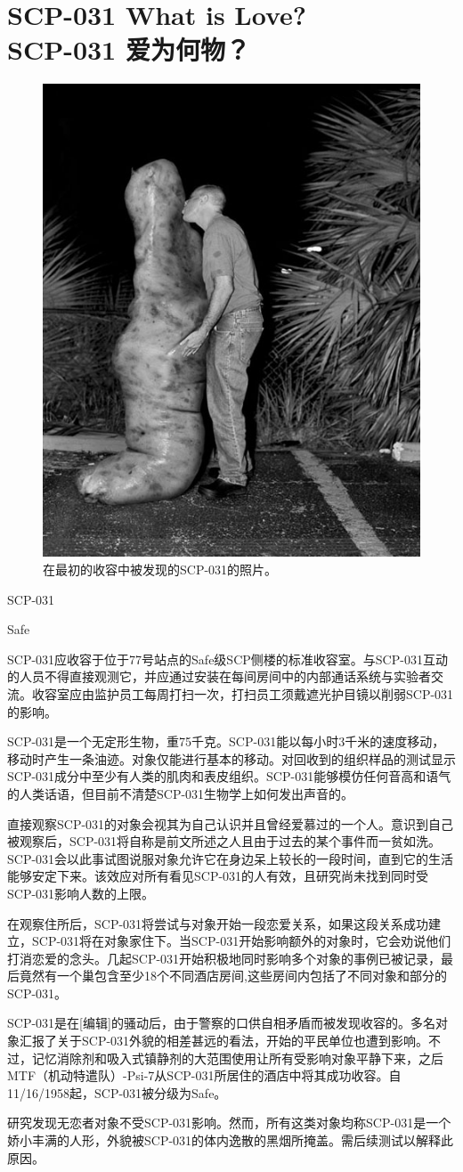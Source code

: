 \chapter[SCP-031 爱为何物？]{
    SCP-031 What is Love?\\
    SCP-031 爱为何物？
}

\label{chap:SCP-031}

\begin{figure}[H]
    \centering
    \includegraphics[width=0.5\linewidth]{images/SCP.031.jpg}
    \caption*{在最初的收容中被发现的SCP-031的照片。}
\end{figure}

SCP-031

Safe

SCP-031应收容于位于77号站点的Safe级SCP侧楼的标准收容室。与SCP-031互动的人员不得直接观测它，并应通过安装在每间房间中的内部通话系统与实验者交流。收容室应由监护员工每周打扫一次，打扫员工须戴遮光护目镜以削弱SCP-031的影响。

SCP-031是一个无定形生物，重75千克。SCP-031能以每小时3千米的速度移动，移动时产生一条油迹。对象仅能进行基本的移动。对回收到的组织样品的测试显示SCP-031成分中至少有人类的肌肉和表皮组织。SCP-031能够模仿任何音高和语气的人类话语，但目前不清楚SCP-031生物学上如何发出声音的。

直接观察SCP-031的对象会视其为自己认识并且曾经爱慕过的一个人。意识到自己被观察后，SCP-031将自称是前文所述之人且由于过去的某个事件而一贫如洗。SCP-031会以此事试图说服对象允许它在身边呆上较长的一段时间，直到它的生活能够安定下来。该效应对所有看见SCP-031的人有效，且研究尚未找到同时受SCP-031影响人数的上限。

在观察住所后，SCP-031将尝试与对象开始一段恋爱关系，如果这段关系成功建立，SCP-031将在对象家住下。当SCP-031开始影响额外的对象时，它会劝说他们打消恋爱的念头。几起SCP-031开始积极地同时影响多个对象的事例已被记录，最后竟然有一个巢包含至少18个不同酒店房间,这些房间内包括了不同对象和部分的SCP-031。

SCP-031是在{[}编辑]的骚动后，由于警察的口供自相矛盾而被发现收容的。多名对象汇报了关于SCP-031外貌的相差甚远的看法，开始的平民单位也遭到影响。不过，记忆消除剂和吸入式镇静剂的大范围使用让所有受影响对象平静下来，之后MTF（机动特遣队）-Psi-7从SCP-031所居住的酒店中将其成功收容。自11\slash 16\slash 1958起，SCP-031被分级为Safe。

研究发现无恋者对象不受SCP-031影响。然而，所有这类对象均称SCP-031是一个娇小丰满的人形，外貌被SCP-031的体内逸散的黑烟所掩盖。需后续测试以解释此原因。
